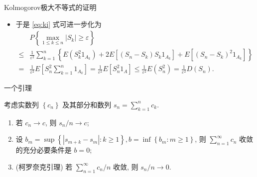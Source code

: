 \documentclass[Prob-All.tex]{subfiles}
\begin{document}
\begin{frame}{Kolmogorov极大不等式的证明}
\begin{itemize}[<+-|alert@+>]
	\item 于是 \eqref{eq:ki} 式可进一步化为
	\[\begin{aligned}
		& P\left\{\max _{1 \leq k \leq n}\left|S_{k}\right| \geq \varepsilon\right\} \\
		\leq & \frac{1}{\varepsilon^{2}} \sum_{k=1}^{n}\left\{E\left(S_{k}^{2} 1_{A_k}\right)+2 E\left[\left(S_{n}-S_{k}\right) S_{k} 1_{A_k}\right]+E\left[\left(S_{n}-S_{k}\right)^{2} 1_{A_k}\right]\right\} \\
		= & \frac{1}{\varepsilon^{2}} E\left[S_{n}^{2} \sum_{k=1}^{n} 1_{A_k}\right]= \frac{1}{\varepsilon^{2}} E\left[S_{n}^{2} 1_A\right]\leq \frac{1}{\varepsilon^{2}} E\left(S_{n}^{2}\right)=\frac{1}{\varepsilon^{2}} D\left(S_{n}\right) .
	\end{aligned}
	\]
\end{itemize}


\end{frame}

\begin{frame}{一个引理}
	\begin{lem}
		考虑实数列 $\left\{c_{n}\right\}$ 及其部分和数列 $s_{n}=\sum_{k=1}^{n} c_{k}$.
		\begin{enumerate}[1.]
		  \item 若 $c_{n} \rightarrow c$, 则 $s_{n} / n \rightarrow c$;
		\item  设 $b_{m}=\sup \left\{\left|s_{m+k}-s_{m}\right|: k \geq 1\right\}, b=\inf \left\{b_{m}: m \geq 1\right\}$, 则 $\sum_{n=1}^{\infty} c_{n}$ 收敛的充分必要条件是 $b=0$;
		\item (柯罗奈克引理) 若 $\sum_{n=1}^{\infty} c_{n} / n$ 收敛, 则 $s_{n} / n \rightarrow 0$.
		\end{enumerate}
	\end{lem}

\end{frame}
\end{document}
